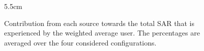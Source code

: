 \def\angle{0}
\def\radius{3}
\def\cyclelist{{"c_myue","c_otheruabs","c_myuabs","c_otherue"}}
\newcount\cyclecount {}
\newcount\ind {}
\begin{figure}[h!]
\centering
 \resizebox {!} {5.5cm} {
 }
\caption{Contribution from each source towards the total SAR that is experienced by the weighted average user. 
The percentages are averaged over the four 
considered configurations.}
\label{fig:pie}
\end{figure}

